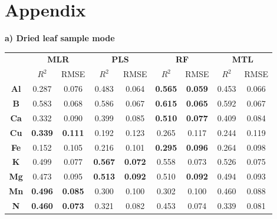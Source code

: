 \documentclass{article}
\begin{document}
\appendix
\section*{Appendix}

\renewcommand{\arraystretch}{0.9}
\setlength{\tabcolsep}{2pt} %

\begin{table}[h!]
\noindent %
\begin{minipage}[t]{0.49\textwidth}
\noindent\textbf{a) Dried leaf sample mode}

\vspace{0.5em}

\begin{tabular}{|c|c|c|c|c|c|c|c|c|}
\hline
 & \multicolumn{2}{c|}{\textbf{MLR}} & \multicolumn{2}{c|}{\textbf{PLS}} & \multicolumn{2}{c|}{\textbf{RF}} & \multicolumn{2}{c|}{\textbf{MTL}} \\
\cline{2-9}
 & $R^2$ & RMSE & $R^2$ & RMSE & $R^2$ & RMSE & $R^2$ & RMSE \\
\hline
\textbf{Al} & 0.287 & 0.076 & 0.483 & 0.064 & {\color{blue}\textbf{0.565}} & {\color{blue}\textbf{0.059}} & 0.453 & 0.066 \\
\textbf{B}  & 0.583 & 0.068 & 0.586 & 0.067 & {\color{blue}\textbf{0.615}} & {\color{blue}\textbf{0.065}} & 0.592 & 0.067 \\
\textbf{Ca} & 0.332 & 0.090 & 0.399 & 0.085 & {\color{blue}\textbf{0.510}} & {\color{blue}\textbf{0.077}} & 0.409 & 0.084 \\
\textbf{Cu} & {\color{blue}\textbf{0.339}} & {\color{blue}\textbf{0.111}} & 0.192 & 0.123 & 0.265 & 0.117 & 0.244 & 0.119 \\
\textbf{Fe} & 0.152 & 0.105 & 0.216 & 0.101 & {\color{blue}\textbf{0.295}} & {\color{blue}\textbf{0.096}} & 0.264 & 0.098 \\
\textbf{K}  & 0.499 & 0.077 & {\color{blue}\textbf{0.567}} & {\color{blue}\textbf{0.072}} & 0.558 & 0.073 & 0.526 & 0.075 \\
\textbf{Mg} & 0.473 & 0.095 & {\color{blue}\textbf{0.513}} & {\color{blue}\textbf{0.092}} & 0.510 & {\color{blue}\textbf{0.092}} & 0.494 & 0.093 \\
\textbf{Mn} & {\color{blue}\textbf{0.496}} & {\color{blue}\textbf{0.085}} & 0.300 & 0.100 & 0.302 & 0.100 & 0.460 & 0.088 \\
\textbf{N}  & {\color{blue}\textbf{0.460}} & {\color{blue}\textbf{0.073}} & 0.321 & 0.082 & 0.453 & 0.074 & 0.339 & 0.081 \\

\end{tabular}
\end{minipage}
\end{table}
\end{document}
